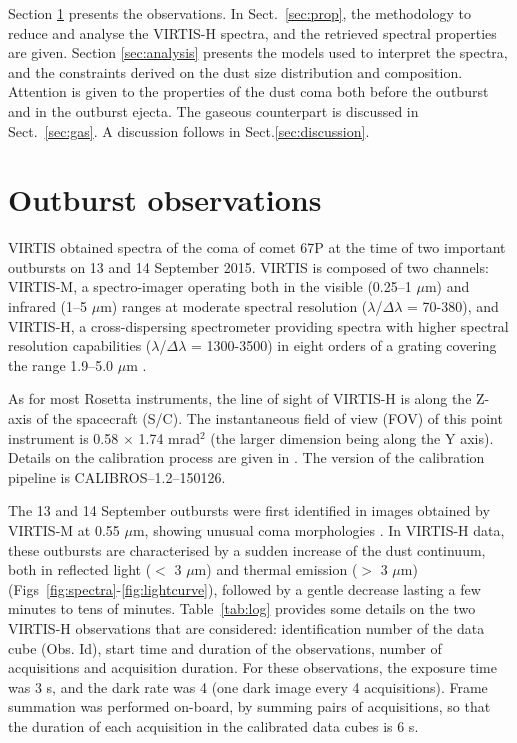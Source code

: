 \documentclass[a4paper,fleqn,usenatbib]{mnras}
\begin{document}
Section \ref{sec:obs} presents the observations. In Sect.~\ref{sec:prop}, the methodology to reduce and analyse the VIRTIS-H spectra, and the retrieved spectral properties are given. Section \ref{sec:analysis} presents the models used to interpret the spectra, and the constraints derived on the dust size distribution and composition. Attention is given to the properties of the dust coma both before the outburst and in the outburst ejecta. The gaseous counterpart is discussed in Sect.~\ref{sec:gas}.
A discussion follows in Sect.\ref{sec:discussion}.



\section{Outburst observations}
\label{sec:obs}
VIRTIS obtained spectra of the coma of comet 67P at the
time of two important outbursts on 13 and 14 September 2015. VIRTIS is composed of two
channels: VIRTIS-M, a spectro-imager operating both in the visible
(0.25--1 $\mu$m) and infrared  (1--5 $\mu$m) ranges at moderate
spectral resolution ($\lambda$/$\Delta \lambda$ = 70-380), and
VIRTIS-H, a cross-dispersing spectrometer providing spectra with higher spectral resolution capabilities
($\lambda$/$\Delta \lambda$ = 1300-3500) in eight
orders of a grating covering the range 1.9--5.0 $\mu$m \citep{Drossart2000,Coradini2007}.


As for most Rosetta instruments, the line of sight of VIRTIS-H is along the Z-axis of the spacecraft (S/C). The instantaneous field of view (FOV) of this
point instrument is 0.58 $\times$ 1.74 mrad$^2$ (the larger
dimension being along the Y axis). Details on the calibration process are given in \citet{dbm2016}.
The version of the calibration pipeline is CALIBROS--1.2--150126.

The 13 and 14 September outbursts were first identified in images obtained by VIRTIS-M at 0.55 $\mu$m, showing unusual coma morphologies \citep{Rinaldi2017}. In VIRTIS-H data, these outbursts are characterised by a sudden increase of the dust continuum, both in reflected light ($<$ 3 $\mu$m) and thermal emission ($>$ 3 $\mu$m) (Figs~\ref{fig:spectra}-\ref{fig:lightcurve}), followed by a gentle decrease lasting a few minutes to tens of  minutes. Table~\ref{tab:log} provides
some details on the two VIRTIS-H observations that are considered: identification number of the data cube (Obs. Id), start time and duration of the observations, number of acquisitions and acquisition duration. For these observations, the exposure time was 3 s, and the dark rate was 4 (one dark image every 4 acquisitions). Frame summation was performed on-board, by summing pairs of acquisitions, so that the duration of each acquisition in the calibrated data cubes is 6 s.
\end{document}
